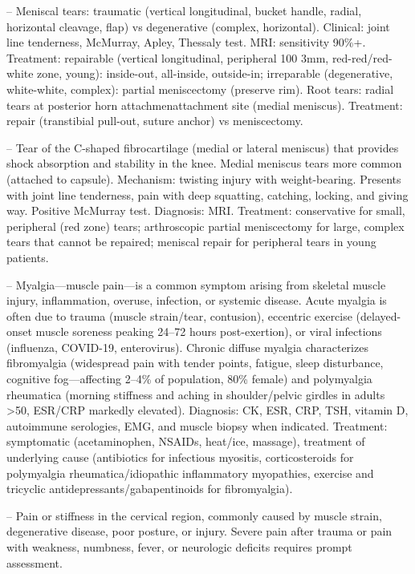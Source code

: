 -- Meniscal tears: traumatic (vertical longitudinal, bucket handle, radial, horizontal cleavage, flap) vs degenerative (complex, horizontal). Clinical: joint line tenderness, McMurray, Apley, Thessaly test. MRI: sensitivity 90\%+. Treatment: repairable (vertical longitudinal, peripheral 100 3mm, red-red/red-white zone, young): inside-out, all-inside, outside-in; irreparable (degenerative, white-white, complex): partial meniscectomy (preserve rim). Root tears: radial tears at posterior horn attachmenattachment site (medial meniscus). Treatment: repair (transtibial pull-out, suture anchor) vs meniscectomy.

-- Tear of the C-shaped fibrocartilage (medial or lateral meniscus) that provides shock absorption and stability in the knee. Medial meniscus tears more common (attached to capsule). Mechanism: twisting injury with weight-bearing. Presents with joint line tenderness, pain with deep squatting, catching, locking, and giving way. Positive McMurray test. Diagnosis: MRI. Treatment: conservative for small, peripheral (red zone) tears; arthroscopic partial meniscectomy for large, complex tears that cannot be repaired; meniscal repair for peripheral tears in young patients.

-- Myalgia—muscle pain—is a common symptom arising from skeletal muscle injury, inflammation, overuse, infection, or systemic disease. Acute myalgia is often due to trauma (muscle strain/tear, contusion), eccentric exercise (delayed-onset muscle soreness peaking 24--72 hours post-exertion), or viral infections (influenza, COVID-19, enterovirus). Chronic diffuse myalgia characterizes fibromyalgia (widespread pain with tender points, fatigue, sleep disturbance, cognitive fog—affecting 2--4\% of population, 80\% female) and polymyalgia rheumatica (morning stiffness and aching in shoulder/pelvic girdles in adults >50, ESR/CRP markedly elevated). Diagnosis: CK, ESR, CRP, TSH, vitamin D, autoimmune serologies, EMG, and muscle biopsy when indicated. Treatment: symptomatic (acetaminophen, NSAIDs, heat/ice, massage), treatment of underlying cause (antibiotics for infectious myositis, corticosteroids for polymyalgia rheumatica/idiopathic inflammatory myopathies, exercise and tricyclic antidepressants/gabapentinoids for fibromyalgia).

-- Pain or stiffness in the cervical region, commonly caused by muscle strain, degenerative disease, poor posture, or injury. Severe pain after trauma or pain with weakness, numbness, fever, or neurologic deficits requires prompt assessment.

